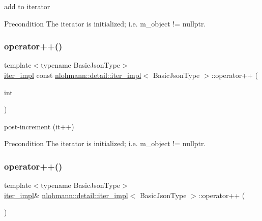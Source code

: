 add to iterator 

\begin{DoxyPrecond}{Precondition}
The iterator is initialized; i.\+e. {\ttfamily m\+\_\+object != nullptr}. 
\end{DoxyPrecond}
\mbox{\label{classnlohmann_1_1detail_1_1iter__impl_a7d2397773b2dce42f30f0375a6a1d850}} 
\subsubsection{\texorpdfstring{operator++()}{operator++()}\hspace{0.1cm}{\footnotesize\ttfamily [1/2]}}
{\footnotesize\ttfamily template$<$typename Basic\+Json\+Type$>$ \\
\hyperlink{classnlohmann_1_1detail_1_1iter__impl}{iter\+\_\+impl} const \hyperlink{classnlohmann_1_1detail_1_1iter__impl}{nlohmann\+::detail\+::iter\+\_\+impl}$<$ Basic\+Json\+Type $>$\+::operator++ (\begin{DoxyParamCaption}\item[{int}]{ }\end{DoxyParamCaption})\hspace{0.3cm}{\ttfamily [inline]}}



post-\/increment (it++) 

\begin{DoxyPrecond}{Precondition}
The iterator is initialized; i.\+e. {\ttfamily m\+\_\+object != nullptr}. 
\end{DoxyPrecond}
\mbox{\label{classnlohmann_1_1detail_1_1iter__impl_abdfe2a7f464400a7ab572782d14b922f}} 
\subsubsection{\texorpdfstring{operator++()}{operator++()}\hspace{0.1cm}{\footnotesize\ttfamily [2/2]}}
{\footnotesize\ttfamily template$<$typename Basic\+Json\+Type$>$ \\
\hyperlink{classnlohmann_1_1detail_1_1iter__impl}{iter\+\_\+impl}\& \hyperlink{classnlohmann_1_1detail_1_1iter__impl}{nlohmann\+::detail\+::iter\+\_\+impl}$<$ Basic\+Json\+Type $>$\+::operator++ (\begin{DoxyParamCaption}{ }\end{DoxyParamCaption})\hspace{0.3cm}{\ttfamily [inline]}}



